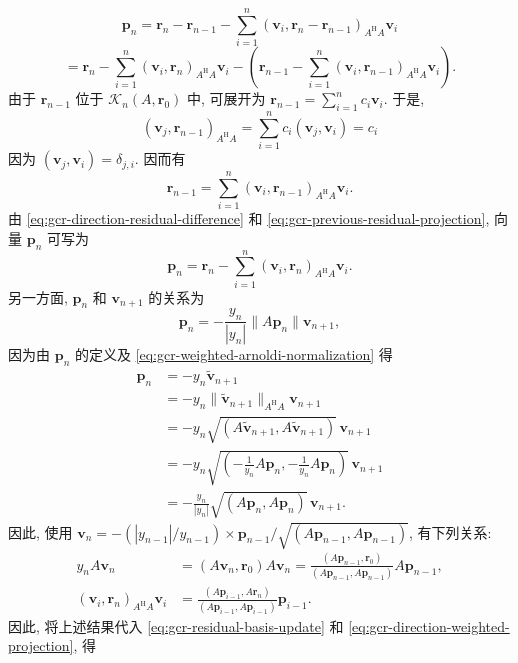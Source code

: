 \begin{equation}\label{eq:gcr-direction-residual-difference}\bm p_n=\bm r_n-\bm r_{n-1}-\sum_{i=1}^n(\bm v_i,\bm r_n-\bm r_{n-1})_{A^{\mathrm H}A}\bm v_i\end{equation}
\[=\bm r_n-\sum_{i=1}^n(\bm v_i,\bm r_n)_{A^{\mathrm H}A}\bm v_i-\left(\bm r_{n-1}-\sum_{i=1}^n(\bm v_i,\bm r_{n-1})_{A^{\mathrm H}A}\bm v_i\right).\]
{由于 $\bm r_{n-1}$ 位于 $\mathcal K_n(A,\bm r_0)$ 中, 可展开为 $\bm r_{n-1}=\sum_{i=1}^nc_i\bm v_i$. 于是,}
\[(\bm v_j,\bm r_{n-1})_{A^{\mathrm H}A}=\sum_{i=1}^nc_i(\bm v_j,\bm v_i)=c_i\]
{因为 $(\bm v_j,\bm v_i)=\delta_{j,i}$. 因而有}
\begin{equation}\label{eq:gcr-previous-residual-projection}\bm r_{n-1}=\sum_{i=1}^n(\bm v_i,\bm r_{n-1})_{A^{\mathrm H}A}\bm v_i.\end{equation}
{由 \eqref{eq:gcr-direction-residual-difference} 和 \eqref{eq:gcr-previous-residual-projection}, 向量 $\bm p_n$ 可写为}
\begin{equation}\label{eq:gcr-direction-weighted-projection}\bm p_n=\bm r_n-\sum_{i=1}^n(\bm v_i,\bm r_n)_{A^{\mathrm H}A}\bm v_i.\end{equation}
{另一方面, $\bm p_n$ 和 $\bm v_{n+1}$ 的关系为}
\[\bm p_n=-\frac{y_n}{|y_n|}\|A\bm p_n\|\bm v_{n+1},\]
{因为由 $\bm p_n$ 的定义及 \eqref{eq:gcr-weighted-arnoldi-normalization} 得}
\[\begin{aligned}\bm p_n&=-y_n\widetilde{\bm v}_{n+1}\\&=-y_n\|\widetilde{\bm v}_{n+1}\|_{A^{\mathrm H}A}\bm v_{n+1}\\&=-y_n\sqrt{(A\widetilde{\bm v}_{n+1},A\widetilde{\bm v}_{n+1})}\,\bm v_{n+1}\\&=-y_n\sqrt{\left(-\frac1{y_n}A\bm p_n,-\frac1{y_n}A\bm p_n\right)}\,\bm v_{n+1}\\&=-\frac{y_n}{|y_n|}\sqrt{(A\bm p_n,A\bm p_n)}\,\bm v_{n+1}.\end{aligned}\]
{因此, 使用 $\bm v_n=-(|y_{n-1}|/y_{n-1})\times\bm p_{n-1}/\sqrt{(A\bm p_{n-1},A\bm p_{n-1})}$, 有下列关系:}
\[\begin{aligned}y_nA\bm v_n&=(A\bm v_n,\bm r_0)A\bm v_n=\frac{(A\bm p_{n-1},\bm r_0)}{(A\bm p_{n-1},A\bm p_{n-1})}A\bm p_{n-1},\\(\bm v_i,\bm r_n)_{A^{\mathrm H}A}\bm v_i&=\frac{(A\bm p_{i-1},A\bm r_n)}{(A\bm p_{i-1},A\bm p_{i-1})}\bm p_{i-1}.\end{aligned}\]
{因此, 将上述结果代入 \eqref{eq:gcr-residual-basis-update} 和 \eqref{eq:gcr-direction-weighted-projection}, 得}
